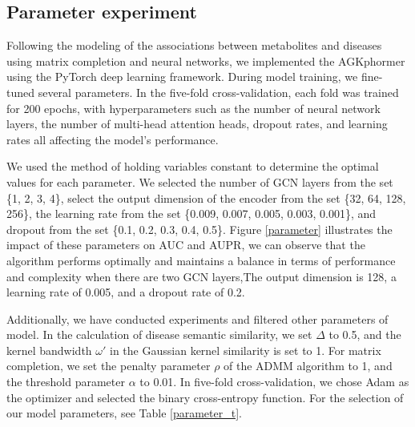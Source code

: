 \documentclass[lettersize,journal]{IEEEtran}
\begin{document}

\subsection{\textbf{Parameter experiment}}

Following the modeling of the associations between metabolites and diseases using matrix completion and neural networks, we implemented the AGKphormer using the PyTorch deep learning framework. During model training, we fine-tuned several parameters. In the five-fold cross-validation, each fold was trained for 200 epochs, with hyperparameters such as the number of neural network layers, the number of multi-head attention heads, dropout rates, and learning rates all affecting the model's performance.

We used the method of holding variables constant to determine the optimal values for each parameter. We selected the number of GCN layers from the set \{1, 2, 3, 4\}, select the output dimension of the encoder from the set \{32, 64, 128, 256\}, the learning rate from the set \{0.009, 0.007, 0.005, 0.003, 0.001\}, and dropout from the set \{0.1, 0.2, 0.3, 0.4, 0.5\}. Figure \ref{parameter} illustrates the impact of these parameters on AUC and AUPR, we can observe that the algorithm performs optimally and maintains a balance in terms of performance and complexity when there are two GCN layers,The output dimension is 128, a learning rate of 0.005, and a dropout rate of 0.2. 

Additionally, we have conducted experiments and filtered other parameters of model. In the calculation of disease semantic similarity, we set \(\Delta\) to 0.5, and the kernel bandwidth \({\omega}'\) in the Gaussian kernel similarity is set to 1. For matrix completion, we set the penalty parameter \(\rho\) of the ADMM algorithm to 1, and the threshold parameter \(\alpha\) to 0.01. In five-fold cross-validation, we chose Adam as the optimizer and selected the binary cross-entropy function. For the selection of our model parameters, see Table \ref{parameter_t}.
\end{document}
